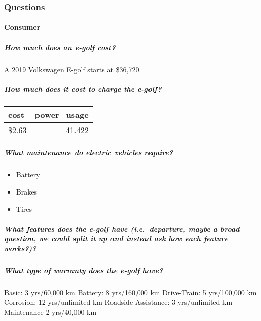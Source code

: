 \documentclass[]{article}
\title{}
\author{}
\date{}
\providecommand{\tightlist}{%
  \setlength{\itemsep}{0pt}\setlength{\parskip}{0pt}}
\let\oldparagraph\paragraph
\renewcommand{\paragraph}[1]{\oldparagraph{#1}\mbox{}}
\let\oldsubparagraph\subparagraph
\renewcommand{\subparagraph}[1]{\oldsubparagraph{#1}\mbox{}}
\begin{document}
\hypertarget{questions}{%
\subsubsection{Questions}\label{questions}}

\hypertarget{consumer}{%
\paragraph{Consumer}\label{consumer}}

\hypertarget{how-much-does-an-e-golf-cost}{%
\subparagraph{How much does an e-golf
cost?}\label{how-much-does-an-e-golf-cost}}

A 2019 Volkswagen E-golf starts at \$36,720.

\hypertarget{how-much-does-it-cost-to-charge-the-e-golf}{%
\subparagraph{How much does it cost to charge the
e-golf?}\label{how-much-does-it-cost-to-charge-the-e-golf}}

\begin{tabular}{l|r}
\hline
cost & power\_usage\\
\hline
\$2.63 & 41.422\\
\hline
\end{tabular}

\hypertarget{what-maintenance-do-electric-vehicles-require}{%
\subparagraph{What maintenance do electric vehicles
require?}\label{what-maintenance-do-electric-vehicles-require}}

\begin{itemize}
\tightlist
\item
  Battery
\item
  Brakes
\item
  Tires
\end{itemize}

\hypertarget{what-features-does-the-e-golf-have-i.e.-departure-maybe-a-broad-question-we-could-split-it-up-and-instead-ask-how-each-feature-works}{%
\subparagraph{What features does the e-golf have (i.e.~departure, maybe
a broad question, we could split it up and instead ask how each feature
works?)?}\label{what-features-does-the-e-golf-have-i.e.-departure-maybe-a-broad-question-we-could-split-it-up-and-instead-ask-how-each-feature-works}}

\hypertarget{what-type-of-warranty-does-the-e-golf-have}{%
\subparagraph{What type of warranty does the e-golf
have?}\label{what-type-of-warranty-does-the-e-golf-have}}

Basic: 3 yrs/60,000 km Battery: 8 yrs/160,000 km Drive-Train: 5
yrs/100,000 km Corrosion: 12 yrs/unlimited km Roadside Assistance: 3
yrs/unlimited km Maintenance 2 yrs/40,000 km
\end{document}
